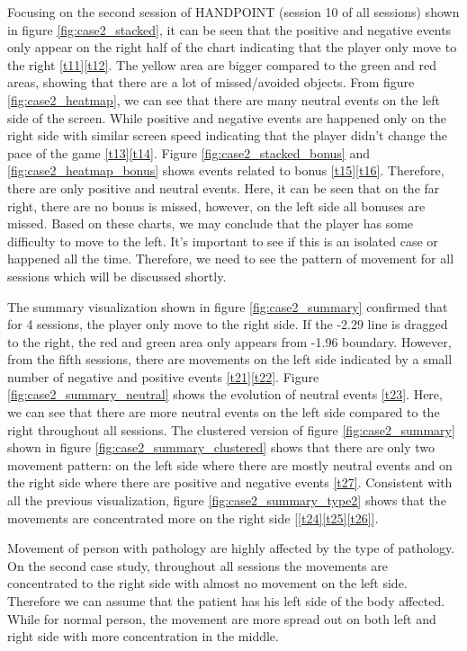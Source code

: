 Focusing on the second session of HANDPOINT (session 10 of all sessions) shown in figure \ref{fig:case2_stacked}, it can be seen that the positive and negative events only appear on the right half of the chart indicating that the player only move to the right \ref{t11}\ref{t12}. The yellow area are bigger compared to the green and red areas, showing that there are a lot of missed/avoided objects. From figure \ref{fig:case2_heatmap}, we can see that there are many neutral events on the left side of the screen. While positive and negative events are happened only on the right side with similar screen speed indicating that the player didn't change the pace of the game \ref{t13}\ref{t14}. Figure \ref{fig:case2_stacked_bonus} and \ref{fig:case2_heatmap_bonus} shows events related to bonus \ref{t15}\ref{t16}. Therefore, there are only positive and neutral events. Here, it can be seen that on the far right, there are no bonus is missed, however, on the left side all bonuses are missed. Based on these charts, we may conclude that the player has some difficulty to move to the left. It's important to see if this is an isolated case or happened all the time. Therefore, we need to see the pattern of movement for all sessions which will be discussed shortly.

The summary visualization shown in figure \ref{fig:case2_summary} confirmed that for 4 sessions, the player only move to the right side. If the -2.29 line is dragged to the right, the red and green area only appears from -1.96 boundary. However, from the fifth sessions, there are movements on the left side indicated by a small number of negative and positive events \ref{t21}\ref{t22}. Figure \ref{fig:case2_summary_neutral} shows the evolution of neutral events \ref{t23}. Here, we can see that there are more neutral events on the left side compared to the right throughout all sessions. The clustered version of figure \ref{fig:case2_summary} shown in figure \ref{fig:case2_summary_clustered} shows that there are only two movement pattern: on the left side where there are mostly neutral events and on the right side where there are positive and negative events \ref{t27}. Consistent with all the previous visualization, figure \ref{fig:case2_summary_type2} shows that the movements are concentrated more on the right side [\ref{t24}\ref{t25}\ref{t26}].

Movement of person with pathology are highly affected by the type of pathology. On the second case study, throughout all sessions the movements are concentrated to the right side with almost no movement on the left side. Therefore we can assume that the patient has his left side of the body affected. While for normal person, the movement are more spread out on both left and right side with more concentration in the middle.

